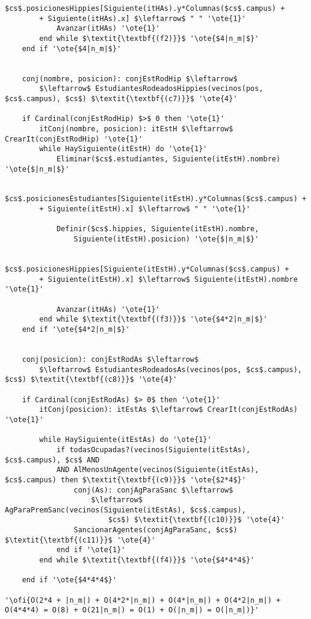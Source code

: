 \begin{lstlisting}[mathescape]
			$cs$.posicionesHippies[Siguiente(itHAs).y*Columnas($cs$.campus) +
		+ Siguiente(itHAs).x] $\leftarrow$ " " '\ote{1}'
			Avanzar(itHAs) '\ote{1}'
		end while $\textit{\textbf{(f2)}}$ '\ote{$4|n_m|$}'
	end if '\ote{$4|n_m|$}'


	conj(nombre, posicion): conjEstRodHip $\leftarrow$
		$\leftarrow$ EstudiantesRodeadosHippies(vecinos(pos, $cs$.campus), $cs$) $\textit{\textbf{(c7)}}$ '\ote{4}'

	if Cardinal(conjEstRodHip) $>$ 0 then '\ote{1}'
		itConj(nombre, posicion): itEstH $\leftarrow$ CrearIt(conjEstRodHip) '\ote{1}'
		while HaySiguiente(itEstH) do '\ote{1}'
			Eliminar($cs$.estudiantes, Siguiente(itEstH).nombre) '\ote{$|n_m|$}'

			$cs$.posicionesEstudiantes[Siguiente(itEstH).y*Columnas($cs$.campus) +
		+ Siguiente(itEstH).x] $\leftarrow$ " " '\ote{1}'

			Definir($cs$.hippies, Siguiente(itEstH).nombre,
				Siguiente(itEstH).posicion) '\ote{$|n_m|$}'

			$cs$.posicionesHippies[Siguiente(itEstH).y*Columnas($cs$.campus) +
		+ Siguiente(itEstH).x] $\leftarrow$ Siguiente(itEstH).nombre '\ote{1}'

			Avanzar(itHAs) '\ote{1}'
		end while $\textit{\textbf{(f3)}}$ '\ote{$4*2|n_m|$}'
	end if '\ote{$4*2|n_m|$}'


	conj(posicion): conjEstRodAs $\leftarrow$
		$\leftarrow$ EstudiantesRodeadosAs(vecinos(pos, $cs$.campus), $cs$) $\textit{\textbf{(c8)}}$ '\ote{4}'

	if Cardinal(conjEstRodAs) $> 0$ then '\ote{1}'
		itConj(posicion): itEstAs $\leftarrow$ CrearIt(conjEstRodAs) '\ote{1}'

		while HaySiguiente(itEstAs) do '\ote{1}'
			if todasOcupadas?(vecinos(Siguiente(itEstAs), $cs$.campus), $cs$ AND
			AND AlMenosUnAgente(vecinos(Siguiente(itEstAs), $cs$.campus) then $\textit{\textbf{(c9)}}$ '\ote{$2*4$}'
				conj(As): conjAgParaSanc $\leftarrow$
					$\leftarrow$ AgParaPremSanc(vecinos(Siguiente(itEstAs), $cs$.campus),
						$cs$) $\textit{\textbf{(c10)}}$ '\ote{4}'
				SancionarAgentes(conjAgParaSanc, $cs$) $\textit{\textbf{(c11)}}$ '\ote{4}'
			end if '\ote{1}'
		end while $\textit{\textbf{(f4)}}$ '\ote{$4*4*4$}'

	end if '\ote{$4*4*4$}'

'\ofi{O(2*4 + |n_m|) + O(4*2*|n_m|) + O(4*|n_m|) + O(4*2|n_m|) + O(4*4*4) = O(8) + O(21|n_m|) = O(1) + O(|n_m|) = O(|n_m|)}'
\end{lstlisting}

